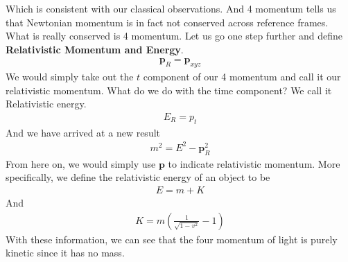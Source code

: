 \documentclass[12pt]{book}
\newcommand{\paren}[1]{\left( #1 \right)}
\begin{document}
Which is consistent with our classical observations. And 4 momentum tells us that Newtonian momentum is in fact not conserved across reference frames. What is really conserved is 4 momentum. Let us go one step further and define \textbf{Relativistic Momentum and Energy}.
\begin{align}
\mathbf{p}_R = \mathbf{p}_{xyz} 
\end{align}
We would simply take out the $t$ component of our 4 momentum and call it our relativistic momentum. What do we do with the time component? We call it Relativistic energy.
\begin{align}
E_R = p_t
\end{align}
And we have arrived at a new result
\begin{align}
m^2 = E^2 - \mathbf{p}_R^2
\end{align}
From here on, we would simply use $\mathbf{p}$ to indicate relativistic momentum. More specifically, we define the relativistic energy of an object to be
\begin{align}
E = m + K
\end{align}
And 
\begin{align}
K = m\paren{\frac{1}{\sqrt{1-v^2}}-1}
\end{align}
With these information, we can see that the four momentum of light is purely kinetic since it has no mass. 







        
\end{document}
